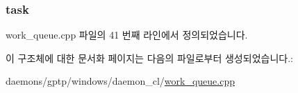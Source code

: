 \subsubsection[{\texorpdfstring{task}{task}}]{ task}\hypertarget{struct_w_w_queue_thread_state_a1252d1bbdec76fb559cd091bd145ed91}{}\label{struct_w_w_queue_thread_state_a1252d1bbdec76fb559cd091bd145ed91}


work\+\_\+queue.\+cpp 파일의 41 번째 라인에서 정의되었습니다.



이 구조체에 대한 문서화 페이지는 다음의 파일로부터 생성되었습니다.\+:\begin{DoxyCompactItemize}
\item 
daemons/gptp/windows/daemon\+\_\+cl/\hyperlink{work__queue_8cpp}{work\+\_\+queue.\+cpp}\end{DoxyCompactItemize}
